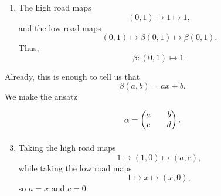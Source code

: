 \documentclass[main.tex]{subfiles}
\begin{document}
\begin{example}
\begin{enumerate}[label=(\arabic*)]
    \item The high road maps
      \begin{equation*}
        (0, 1) \mapsto 1 \mapsto 1,
      \end{equation*}
      and the low road maps
      \begin{equation*}
        (0, 1) \mapsto \beta(0, 1) \mapsto \beta(0, 1).
      \end{equation*}
      Thus,
      \begin{equation*}
        \beta\colon (0, 1) \mapsto 1.
      \end{equation*}
  \end{enumerate}
  Already, this is enough to tell us that
  \begin{equation*}
    \beta(a, b) = ax + b.
  \end{equation*}
  We make the ansatz
  \begin{equation*}
    \begin{tikzcd}
      \alpha =
      \begin{pmatrix}
        a & b \\
        c & d
      \end{pmatrix}.
    \end{tikzcd}
  \end{equation*}
  \begin{enumerate}[label=(\arabic*)]\setcounter{enumi}{2}
    \item Taking the high road maps
      \begin{equation*}
        1 \mapsto (1, 0) \mapsto (a, c),
      \end{equation*}
      while taking the low road maps
      \begin{equation*}
        1 \mapsto x \mapsto (x, 0),
      \end{equation*}
      so $a = x$ and $c = 0$.


\end{enumerate}
\end{example}
\end{document}
